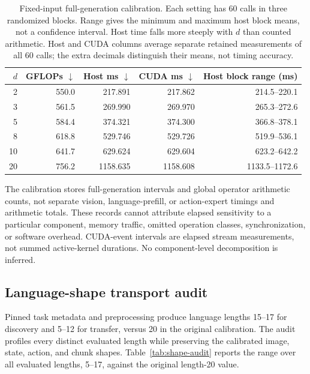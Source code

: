 \documentclass{article}
\begin{document}
\begin{table}[htbp]
\centering\small
\caption{Fixed-input full-generation calibration. Each setting has 60 calls in
three randomized blocks. Range gives the minimum and maximum host block means,
not a confidence interval. Host time falls more steeply with $d$ than counted
arithmetic. Host and CUDA columns average separate retained measurements of all
60 calls; the extra decimals distinguish their means, not timing accuracy.}
\begin{tabular}{@{}rrrrr@{}}
\toprule
$d$ & GFLOPs $\downarrow$ & Host ms $\downarrow$ & CUDA ms $\downarrow$ & Host block range (ms)\\
\midrule
2 & 550.0 & 217.891 & 217.862 & 214.5--220.1\\
3 & 561.5 & 269.990 & 269.970 & 265.3--272.6\\
5 & 584.4 & 374.321 & 374.300 & 366.8--378.1\\
8 & 618.8 & 529.746 & 529.726 & 519.9--536.1\\
10 & 641.7 & 629.624 & 629.604 & 623.2--642.2\\
20 & 756.2 & 1158.635 & 1158.608 & 1133.5--1172.6\\
\bottomrule
\end{tabular}
\end{table}

The calibration stores full-generation intervals and global operator arithmetic
counts, not separate vision, language-prefill, or action-expert timings and
arithmetic totals. These records cannot attribute elapsed sensitivity to a
particular component, memory traffic, omitted operation classes, synchronization,
or software overhead. CUDA-event intervals are elapsed stream measurements,
not summed active-kernel durations. No component-level decomposition is inferred.

\subsection{Language-shape transport audit}
\label{app:shape-audit}

Pinned task metadata and preprocessing produce language lengths 15--17 for
discovery and 5--12 for transfer, versus 20 in the original calibration. The
audit profiles every distinct evaluated length while preserving the calibrated
image, state, action, and chunk shapes. Table~\ref{tab:shape-audit} reports the
range over all evaluated lengths, 5--17, against the original length-20 value.
\end{document}

